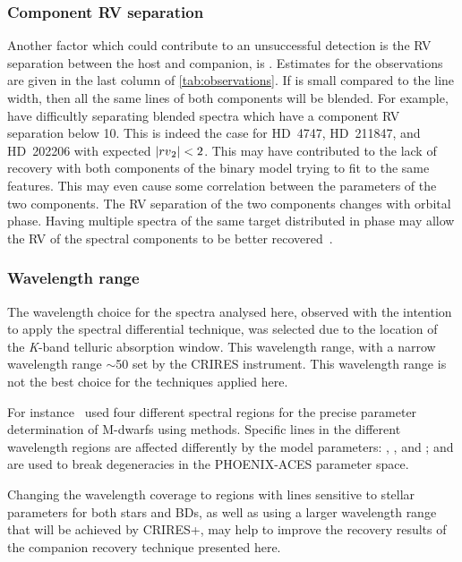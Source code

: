 \subsubsection{Component {RV} separation}
\label{subsubsec:rv_seperation}
Another factor which could contribute to an unsuccessful detection is the {RV} separation between the host and companion, is \Rvtwo{}.
Estimates for the observations are given in the last column of \cref{tab:observations}.
If \Rvtwo{} is small compared to the line width, then all the same lines of both components will be blended.
For example, \citep{kolbl_detection_2015} have difficultly separating blended spectra which have a component {RV} separation below 10\kmps{}.
This is indeed the case for {HD~4747}, {HD~211847}, and {HD~202206} with expected \(|{rv{}}_{2}{}| < 2\)\kmps{}.
This may have contributed to the lack of recovery with both components of the binary model trying to fit to the same features.
This may even cause some correlation between the parameters of the two components.
The {RV} separation of the two components changes with orbital phase.
Having multiple spectra of the same target distributed in phase may allow the {RV} of the spectral components to be better recovered~\citep [e.g.][]{czekala_disentangling_2017, sablowski_spectral_2016, piskorz_evidence_2016}.


\subsubsection {Wavelength range}
\label{subsubsec:wavelenght_range_limitation}
The wavelength choice for the spectra analysed here, observed with the intention to apply the spectral differential technique, was selected due to the location of the \emph{K}-band telluric absorption window.
This wavelength range, with a narrow wavelength range \(\sim\)50\nm{} set by the CRIRES instrument.
This wavelength range is not the best choice for the techniques applied here.

For instance~\citet{passegger_fundamental_2016} used four different spectral regions for the precise parameter determination of M-dwarfs using \textchisquared{} methods.
Specific lines in the different wavelength regions are affected differently by the model parameters: \Teff{}, \Logg{}, and \feh{}; and are used to break degeneracies in the {PHOENIX-ACES} parameter space.

Changing the wavelength coverage to regions with lines sensitive to stellar parameters for both stars and {BD}s, as well as using a larger wavelength range that will be achieved by {CRIRES+}, may help to improve the recovery results of the companion recovery technique presented here.

